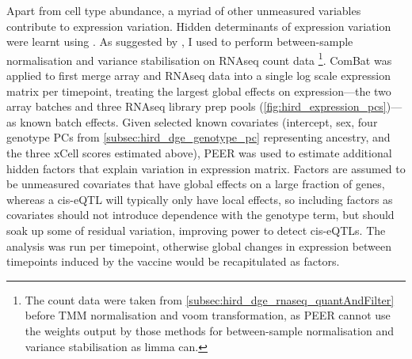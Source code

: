 %
%
Apart from cell type abundance, a myriad of other unmeasured variables contribute to expression variation.
Hidden determinants of expression variation were learnt using  \autocite{stegle2012UsingProbabilisticEstimation}.
As suggested by \textcite{stegle2012UsingProbabilisticEstimation}, I used  to perform between-sample normalisation and variance stabilisation on \gls{RNAseq} count data%
\footnote{
    The count data were taken from \cref{subsec:hird_dge_rnaseq_quantAndFilter} before \gls{TMM} normalisation and voom transformation,
    as PEER cannot use the weights output by those methods for between-sample normalisation and variance stabilisation as limma can.
}.
ComBat was applied to first merge array and \gls{RNAseq} data into a single log scale expression matrix per timepoint, treating the largest global effects on expression---the two array batches and three \gls{RNAseq} library prep pools (\cref{fig:hird_expression_pcs})---as known batch effects.
Given selected known covariates (intercept, sex, four genotype \glspl{PC} from \cref{subsec:hird_dge_genotype_pc} representing ancestry, and the three xCell scores estimated above),
PEER was used to estimate additional hidden factors that explain variation in expression matrix.
Factors are assumed to be unmeasured covariates that have global effects on a large fraction of genes, 
whereas a cis-\gls{eQTL} will typically only have local effects, so including factors as covariates should not introduce dependence with the genotype term,
but should soak up some of residual variation, improving power to detect cis-\glspl{eQTL}.
The analysis was run per timepoint, otherwise global changes in expression between timepoints induced by the vaccine would be recapitulated as factors.

